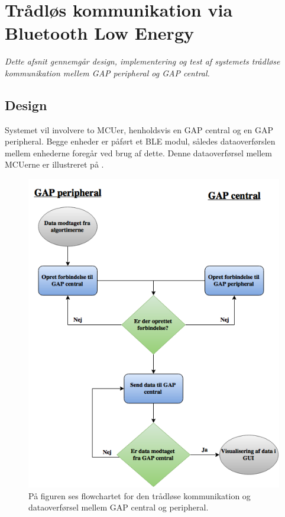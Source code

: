 \section{Trådløs kommunikation via Bluetooth Low Energy}
\textit{Dette afsnit gennemgår design, implementering og test af systemets trådløse kommunikation mellem GAP peripheral og GAP central.}

\subsection{Design}
Systemet vil involvere to MCUer, henholdsvis en GAP central og en GAP peripheral. Begge enheder er påført et BLE modul, således dataoverførslen mellem enhederne foregår ved brug af dette. Denne dataoverførsel mellem MCUerne er illustreret på . 
\begin{figure}[H]
	\centering
	\includegraphics[scale=0.5]{figures/cDesign/blue_pseudo.png}
	\caption{På figuren ses flowchartet for den trådløse kommunikation og dataoverførsel mellem GAP central og peripheral.}
	\label{fig:blue_pseudo}
\end{figure}\vspace{-.25cm}
